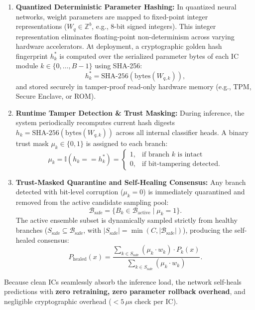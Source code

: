\documentclass[conference,10pt]{IEEEtran}
\begin{document}
\begin{enumerate}
    \item \textbf{Quantized Deterministic Parameter Hashing:} In quantized neural networks, weight parameters are mapped to fixed-point integer representations ($W_q \in \mathbb{Z}^b$, e.g., 8-bit signed integers). This integer representation eliminates floating-point non-determinism across varying hardware accelerators. At deployment, a cryptographic golden hash fingerprint $h_k^*$ is computed over the serialized parameter bytes of each IC module $k \in \{0, \dots, B-1\}$ using SHA-256:
    \begin{equation}
        h_k^* = \text{SHA-256}\left(\text{bytes}(W_{q, k})\right),
    \end{equation}
    and stored securely in tamper-proof read-only hardware memory (e.g., TPM, Secure Enclave, or ROM).
    \item \textbf{Runtime Tamper Detection \& Trust Masking:} During inference, the system periodically recomputes current hash digests $h_k = \text{SHA-256}(\text{bytes}(W_{q, k}))$ across all internal classifier heads. A binary trust mask $\mu_k \in \{0, 1\}$ is assigned to each branch:
    \begin{equation}
        \mu_k = \mathbb{I}\left( h_k == h_k^* \right) = \begin{cases} 1, & \text{if branch } k \text{ is intact} \\ 0, & \text{if bit-tampering detected.} \end{cases}
    \end{equation}
    \item \textbf{Trust-Masked Quarantine and Self-Healing Consensus:} Any branch detected with bit-level corruption ($\mu_k = 0$) is immediately quarantined and removed from the active candidate sampling pool:
    \begin{equation}
        \mathcal{B}_{\text{safe}} = \{ B_k \in \mathcal{B}_{\text{active}} \mid \mu_k = 1 \}.
    \end{equation}
    The active ensemble subset is dynamically sampled strictly from healthy branches ($S_{\text{safe}} \subseteq \mathcal{B}_{\text{safe}}$, with $|S_{\text{safe}}| = \min(C, |\mathcal{B}_{\text{safe}}|)$), producing the self-healed consensus:
    \begin{equation}
        P_{\text{healed}}(x) = \frac{\sum_{k \in S_{\text{safe}}} (\mu_k \cdot w_k) \cdot P_k(x)}{\sum_{k \in S_{\text{safe}}} (\mu_k \cdot w_k)}.
    \end{equation}
\end{enumerate}
Because clean ICs seamlessly absorb the inference load, the network self-heals predictions with \textbf{zero retraining, zero parameter rollback overhead}, and negligible cryptographic overhead ($<5\,\mu\text{s}$ check per IC).
\end{document}
